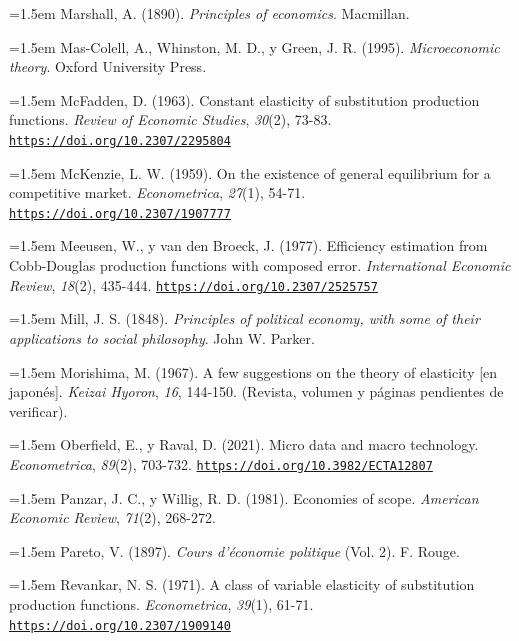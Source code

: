 \documentclass[10pt,a4paper]{article}
\begin{document}
\noindent\hangindent=1.5em Marshall, A. (1890). \textit{Principles of economics}. Macmillan.

\noindent\hangindent=1.5em Mas-Colell, A., Whinston, M. D., y Green, J. R. (1995). \textit{Microeconomic theory}. Oxford University Press.

\noindent\hangindent=1.5em McFadden, D. (1963). Constant elasticity of substitution production functions. \textit{Review of Economic Studies}, \textit{30}(2), 73-83. \href{https://doi.org/10.2307/2295804}{\nolinkurl{https://doi.org/10.2307/2295804}}

\noindent\hangindent=1.5em McKenzie, L. W. (1959). On the existence of general equilibrium for a competitive market. \textit{Econometrica}, \textit{27}(1), 54-71. \href{https://doi.org/10.2307/1907777}{\nolinkurl{https://doi.org/10.2307/1907777}}

\noindent\hangindent=1.5em Meeusen, W., y van den Broeck, J. (1977). Efficiency estimation from Cobb-Douglas production functions with composed error. \textit{International Economic Review}, \textit{18}(2), 435-444. \href{https://doi.org/10.2307/2525757}{\nolinkurl{https://doi.org/10.2307/2525757}}

\noindent\hangindent=1.5em Mill, J. S. (1848). \textit{Principles of political economy, with some of their applications to social philosophy}. John W. Parker.

\noindent\hangindent=1.5em Morishima, M. (1967). A few suggestions on the theory of elasticity [en japonés]. \textit{Keizai Hyoron}, \textit{16}, 144-150. (Revista, volumen y páginas pendientes de verificar).

\noindent\hangindent=1.5em Oberfield, E., y Raval, D. (2021). Micro data and macro technology. \textit{Econometrica}, \textit{89}(2), 703-732. \href{https://doi.org/10.3982/ECTA12807}{\nolinkurl{https://doi.org/10.3982/ECTA12807}}

\noindent\hangindent=1.5em Panzar, J. C., y Willig, R. D. (1981). Economies of scope. \textit{American Economic Review}, \textit{71}(2), 268-272.

\noindent\hangindent=1.5em Pareto, V. (1897). \textit{Cours d'économie politique} (Vol. 2). F. Rouge.

\noindent\hangindent=1.5em Revankar, N. S. (1971). A class of variable elasticity of substitution production functions. \textit{Econometrica}, \textit{39}(1), 61-71. \href{https://doi.org/10.2307/1909140}{\nolinkurl{https://doi.org/10.2307/1909140}}
\end{document}
